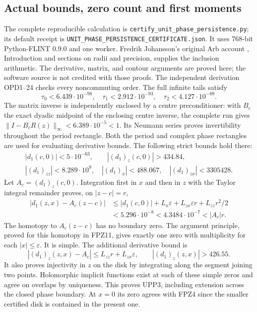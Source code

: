 \subsection{Actual bounds, zero count and first moments}
The complete reproducible calculation is
\texttt{certify\_unit\_phase\_persistence.py}; its default receipt is
\texttt{UNIT\_PHASE\_PERSISTENCE\_CERTIFICATE.json}.
It uses 768-bit Python-FLINT 0.9.0 and one worker.
Fredrik Johansson's original Arb account \cite{human:arb2016},
Introduction and sections on radii and precision, supplies the
inclusion arithmetic. The derivative, matrix, and contour arguments
are proved here; the software source is not credited with those proofs.
The independent derivation OPD1--24 checks every noncommuting order.
The full infinite tails satisfy
\[
 \tau_0<6.439\cdot10^{-98},\quad
 \tau_1<2.912\cdot10^{-93},\quad
 \tau_2<4.127\cdot10^{-89}.
 \tag{UPP9}
\]
The matrix inverse is independently enclosed by a centre
preconditioner: with $B_c$ the exact dyadic midpoint of the
enclosing centre inverse, the complete run gives
$\|I-B_cR(z)\|_\infty<6.389\cdot10^{-5}<1$.
Its Neumann series proves invertibility throughout the period rectangle.
Both the period and complex phase rectangles are used for evaluating
derivative bounds. The following strict bounds hold there:
\[
 \begin{gathered}
 |d_1(c,0)|<5\cdot10^{-63},\qquad |(d_1)_z(c,0)|>434.84,\\
 |(d_1)_{zz}|<8.289\cdot10^9,\quad
 |(d_1)_x|<488.067,\quad |(d_1)_{zx}|<3305428.
 \end{gathered}\tag{UPP10}
\]
Let $A_c=(d_1)_z(c,0)$. Integration first in $x$ and then in $z$
with the Taylor integral remainder proves, on $|z-c|=r$,
\[
 \begin{aligned}
 |d_1(z,x)-A_c(z-c)|
 &\le |d_1(c,0)|+L_x\varepsilon
       +L_{zx}\varepsilon r+L_{zz}r^2/2\\
 &<5.296\cdot10^{-8}<4.3484\cdot10^{-7}<|A_c|r.
 \end{aligned}\tag{UPP11}
\]
The homotopy to $A_c(z-c)$ has no boundary zero. The argument
principle, proved for this homotopy in FPZ11, gives exactly one
zero with multiplicity for each $|x|\le\varepsilon$.
It is simple. The additional derivative bound is
\[
 |(d_1)_z(z,x)-A_c|\le L_{zz}r+L_{zx}\varepsilon,
 \qquad |(d_1)_z(z,x)|>426.55.
 \tag{UPP12}
\]
It also proves injectivity in $z$ on the disk by integrating along
the segment joining two points. Holomorphic implicit functions exist
at each of these simple zeros and agree on overlaps by uniqueness.
This proves UPP3, including extension across the closed phase boundary.
At $x=0$ its zero agrees with FPZ4 since the smaller certified disk
is contained in the present one.

